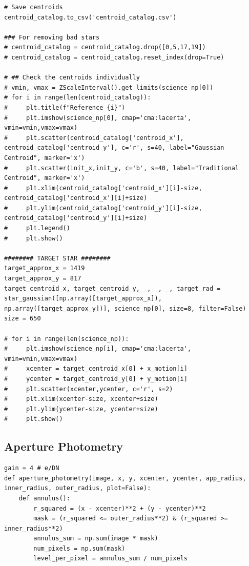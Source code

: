 \documentclass{article}
\begin{document}
\begin{appendices}
\begin{scriptsize}
\begin{verbatim}
# Save centroids
centroid_catalog.to_csv('centroid_catalog.csv')

### For removing bad stars
# centroid_catalog = centroid_catalog.drop([0,5,17,19])
# centroid_catalog = centroid_catalog.reset_index(drop=True)

# ## Check the centroids individually
# vmin, vmax = ZScaleInterval().get_limits(science_np[0])
# for i in range(len(centroid_catalog)):
#     plt.title(f"Reference {i}")
#     plt.imshow(science_np[0], cmap='cma:lacerta', vmin=vmin,vmax=vmax)
#     plt.scatter(centroid_catalog['centroid_x'], centroid_catalog['centroid_y'], c='r', s=40, label="Gaussian Centroid", marker='x')
#     plt.scatter(init_x,init_y, c='b', s=40, label="Traditional Centroid", marker='x')
#     plt.xlim(centroid_catalog['centroid_x'][i]-size, centroid_catalog['centroid_x'][i]+size)
#     plt.ylim(centroid_catalog['centroid_y'][i]-size, centroid_catalog['centroid_y'][i]+size)
#     plt.legend()
#     plt.show()

######## TARGET STAR ########
target_approx_x = 1419
target_approx_y = 817
target_centroid_x, target_centroid_y, _, _, _, target_rad = star_gaussian([np.array([target_approx_x]), np.array([target_approx_y])], science_np[0], size=8, filter=False)
size = 650

# for i in range(len(science_np)):
#     plt.imshow(science_np[i], cmap='cma:lacerta', vmin=vmin,vmax=vmax)
#     xcenter = target_centroid_x[0] + x_motion[i]
#     ycenter = target_centroid_y[0] + y_motion[i]
#     plt.scatter(xcenter,ycenter, c='r', s=2)
#     plt.xlim(xcenter-size, xcenter+size)
#     plt.ylim(ycenter-size, ycenter+size)
#     plt.show()
\end{verbatim}
\end{scriptsize}


\subsection{Aperture Photometry}
\begin{scriptsize}
\begin{verbatim}
gain = 4 # e/DN
def aperture_photometry(image, x, y, xcenter, ycenter, app_radius, inner_radius, outer_radius, plot=False):
    def annulus():
        r_squared = (x - xcenter)**2 + (y - ycenter)**2
        mask = (r_squared <= outer_radius**2) & (r_squared >= inner_radius**2)
        annulus_sum = np.sum(image * mask)
        num_pixels = np.sum(mask)
        level_per_pixel = annulus_sum / num_pixels
        

\end{verbatim}
\end{scriptsize}
\end{appendices}
\end{document}
